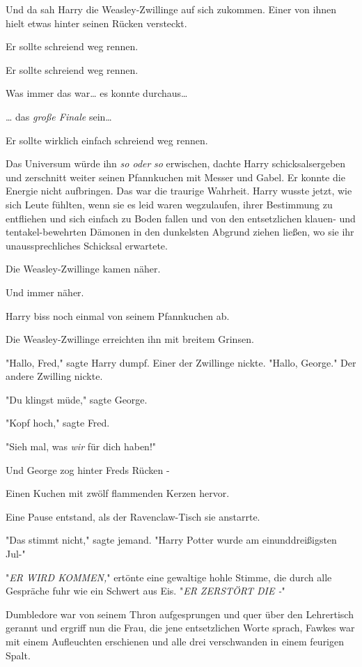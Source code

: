 {Und da sah Harry die Weasley-Zwillinge auf sich zukommen. Einer von ihnen hielt etwas hinter seinen Rücken versteckt.

Er sollte schreiend weg rennen.

Er sollte schreiend weg rennen.

Was immer das war… es konnte durchaus…

… das \emph{große Finale} sein…

Er sollte wirklich einfach schreiend weg rennen.

Das Universum würde ihn \emph{so oder} \emph{so} erwischen, dachte Harry schicksalsergeben und zerschnitt weiter seinen Pfannkuchen mit Messer und Gabel. Er konnte die Energie nicht aufbringen. Das war die traurige Wahrheit. Harry wusste jetzt, wie sich Leute fühlten, wenn sie es leid waren wegzulaufen, ihrer Bestimmung zu entfliehen und sich einfach zu Boden fallen und von den entsetzlichen klauen- und tentakel-bewehrten Dämonen in den dunkelsten Abgrund ziehen ließen, wo sie ihr unaussprechliches Schicksal erwartete.

Die Weasley-Zwillinge kamen näher.

Und immer näher.

Harry biss noch einmal von seinem Pfannkuchen ab.

Die Weasley-Zwillinge erreichten ihn mit breitem Grinsen.

"Hallo, Fred," sagte Harry dumpf. Einer der Zwillinge nickte. "Hallo, George." Der andere Zwilling nickte.

"Du klingst müde," sagte George.

"Kopf hoch," sagte Fred.

"Sieh mal, was \emph{wir} für dich haben!"

Und George zog hinter Freds Rücken -

Einen Kuchen mit zwölf flammenden Kerzen hervor.

Eine Pause entstand, als der Ravenclaw-Tisch sie anstarrte.

"Das stimmt nicht," sagte jemand. "Harry Potter wurde am einunddreißigsten Jul-"

"\emph{ER WIRD KOMMEN,}" ertönte eine gewaltige hohle Stimme, die durch alle Gespräche fuhr wie ein Schwert aus Eis. "\emph{ER ZERSTÖRT DIE -}"

Dumbledore war von seinem Thron aufgesprungen und quer über den Lehrertisch gerannt und ergriff nun die Frau, die jene entsetzlichen Worte sprach, Fawkes war mit einem Aufleuchten erschienen und alle drei verschwanden in einem feurigen Spalt.

}

